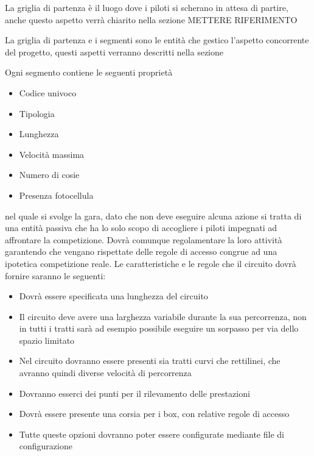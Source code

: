 \documentclass[a4paper,11pt, twoside]{book}
\begin{document}
	La griglia di partenza è il luogo dove i piloti si scherano in attesa di partire, anche questo aspetto
	verrà chiarito nella sezione METTERE RIFERIMENTO
	
	
	La griglia di partenza e i segmenti sono le entità che gestico l'aspetto concorrente del progetto,
	questi aspetti verranno descritti nella sezione 
	
        
	
	Ogni segmento contiene le seguenti proprietà
	\begin{itemize}
	  \item Codice univoco
	  \item Tipologia
	  \item Lunghezza
	  \item Velocità massima
	  \item Numero di cosie
	  \item Presenza fotocellula
	\end{itemize}
	
	
	
	
	
	
	
	
        
	nel quale si svolge la gara, dato che non deve 
	eseguire alcuna azione si
	tratta di una entità passiva che ha lo solo scopo di accogliere i piloti impegnati ad affrontare la
	competizione.
	Dovrà comunque regolamentare la loro attività garantendo che vengano rispettate delle regole di accesso congrue
	ad una ipotetica competizione reale. 
	Le caratteristiche e le regole che il circuito dovrà fornire saranno le seguenti:
	
	\begin{itemize}
	  \item Dovrà essere specificata una lunghezza del circuito
	  \item Il circuito deve avere una larghezza variabile durante la sua percorrenza, non in tutti i tratti sarà
		ad esempio possibile eseguire un sorpasso per via dello spazio limitato
	  \item Nel circuito dovranno essere presenti sia tratti curvi che rettilinei, che avranno quindi diverse velocità
		di percorrenza
	  \item Dovranno esserci dei punti per il rilevamento delle prestazioni
	  \item Dovrà essere presente una corsia per i box, con relative regole di accesso
	  \item Tutte queste opzioni dovranno poter essere configurate mediante file di configurazione
	\end{itemize}
	
\end{document}
